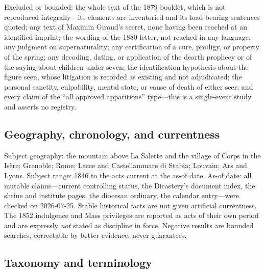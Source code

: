 Excluded or bounded: the whole text of the 1879 booklet, which is
not reproduced integrally---its elements are inventoried and its
load-bearing sentences quoted; any text of Maximin Giraud's secret,
none having been reached at an identified imprint; the wording of
the 1880 letter, not reached in any language; any judgment
on supernaturality; any certification of a cure, prodigy, or
property of the spring; any decoding, dating, or application of the
dearth prophecy or of the saying about children under seven; the
identification hypothesis about the figure seen, whose litigation is
recorded as existing and not adjudicated; the personal sanctity,
culpability, mental state, or cause of death of either seer; and
every claim of the ``all approved apparitions'' type---this is a
single-event study and asserts no registry.

\subsection*{Geography, chronology, and currentness}

Subject geography: the mountain above La Salette and the village of
Corps in the Isère; Grenoble; Rome; Lecce and Castellammare di
Stabia; Louvain; Ars and Lyons. Subject range: 1846 to the acts
current at the as-of date. As-of date: all mutable claims---current
controlling status, the Dicastery's document index, the shrine and
institute pages, the diocesan ordinary, the calendar entry---were
checked on 2026-07-25. Stable historical facts are not given
artificial currentness. The 1852 indulgence and Mass privileges are
reported as acts of their own period and are expressly \emph{not}
stated as discipline in force. Negative results are bounded searches,
correctable by better evidence, never guarantees.

\subsection*{Taxonomy and terminology}

